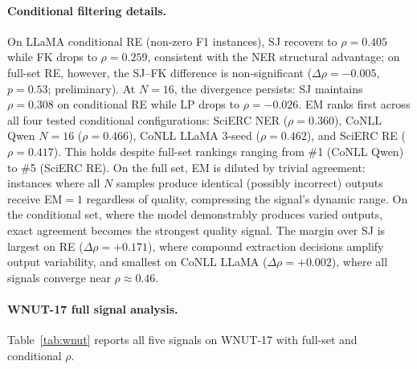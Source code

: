 \paragraph{Conditional filtering details.}
On LLaMA conditional RE (non-zero F1 instances), SJ recovers to $\rho{=}0.405$ while FK drops to $\rho{=}0.259$, consistent with the NER structural advantage; on full-set RE, however, the SJ--FK difference is non-significant ($\Delta\rho{=}{-}0.005$, $p{=}0.53$; preliminary).
At $N{=}16$, the divergence persists: SJ maintains $\rho{=}0.308$ on conditional RE while LP drops to $\rho{=}{-}0.026$.
EM ranks first across all four tested conditional configurations: SciERC NER ($\rho{=}0.360$), CoNLL Qwen $N{=}16$ ($\rho{=}0.466$), CoNLL LLaMA 3-seed ($\rho{=}0.462$), and SciERC RE ($\rho{=}0.417$). This holds despite full-set rankings ranging from \#1 (CoNLL Qwen) to \#5 (SciERC RE).
On the full set, EM is diluted by trivial agreement: instances where all $N$ samples produce identical (possibly incorrect) outputs receive EM${=}1$ regardless of quality, compressing the signal's dynamic range.
On the conditional set, where the model demonstrably produces varied outputs, exact agreement becomes the strongest quality signal.
The margin over SJ is largest on RE ($\Delta\rho{=}{+}0.171$), where compound extraction decisions amplify output variability, and smallest on CoNLL LLaMA ($\Delta\rho{=}{+}0.002$), where all signals converge near $\rho{\approx}0.46$.

\paragraph{WNUT-17 full signal analysis.}
Table~\ref{tab:wnut} reports all five signals on WNUT-17 with full-set and conditional $\rho$.

